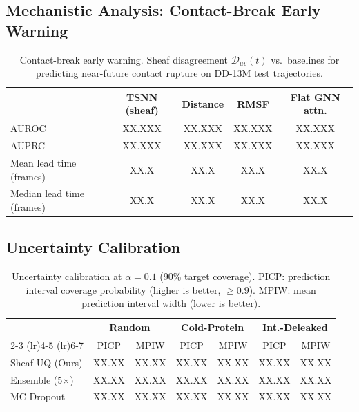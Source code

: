 \documentclass{article}
\begin{document}
\subsection{Mechanistic Analysis: Contact-Break Early Warning}
\label{sec:mechanistic}

\begin{table}[t]
\caption{Contact-break early warning.  Sheaf disagreement
  $\mathcal{D}_{uv}(t)$ vs.\ baselines for predicting near-future
  contact rupture on DD-13M test trajectories.}
\label{tab:mechanistic}
\centering
\footnotesize
\begin{tabular}{@{}lcccc@{}}
\toprule
& TSNN (sheaf) & Distance & RMSF & Flat GNN attn. \\
\midrule
AUROC & XX.XXX & XX.XXX & XX.XXX & XX.XXX \\
AUPRC & XX.XXX & XX.XXX & XX.XXX & XX.XXX \\
Mean lead time (frames) & XX.X & XX.X & XX.X & XX.X \\
Median lead time (frames) & XX.X & XX.X & XX.X & XX.X \\
\bottomrule
\end{tabular}
\end{table}

\subsection{Uncertainty Calibration}

\begin{table}[t]
\caption{Uncertainty calibration at $\alpha{=}0.1$ (90\% target
  coverage).  PICP: prediction interval coverage probability (higher
  is better, $\ge 0.9$).  MPIW: mean prediction interval width
  (lower is better).}
\label{tab:uncertainty}
\centering
\footnotesize
\begin{tabular}{@{}lcccccc@{}}
\toprule
& \multicolumn{2}{c}{Random} & \multicolumn{2}{c}{Cold-Protein}
& \multicolumn{2}{c}{Int.-Deleaked} \\
\cmidrule(lr){2-3} \cmidrule(lr){4-5} \cmidrule(lr){6-7}
& PICP & MPIW & PICP & MPIW & PICP & MPIW \\
\midrule
Sheaf-UQ (Ours) & XX.XX & XX.XX & XX.XX & XX.XX & XX.XX & XX.XX \\
Ensemble (5$\times$) & XX.XX & XX.XX & XX.XX & XX.XX & XX.XX & XX.XX \\
MC Dropout & XX.XX & XX.XX & XX.XX & XX.XX & XX.XX & XX.XX \\
\bottomrule
\end{tabular}
\end{table}
\end{document}
